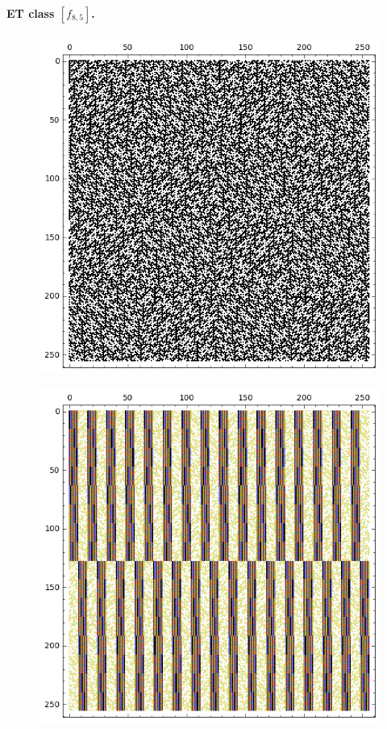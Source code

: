 \documentclass[12pt,a4paper]{article}
\begin{document}
\paragraph*{ET class $[f_{8,5}]$.}
\begin{figure}[!hb]
\centering
\begin{minipage}{.48\textwidth}
  \centering
  \includegraphics[width=.9\linewidth]{../matrix_plot/re8_5_weight_class_matrix.png}
  \label{fig:8_5_weight_class_matrix}
\end{minipage}%
\begin{minipage}{.48\textwidth}
  \centering
  \includegraphics[width=.9\linewidth]{../matrix_plot/re8_5_bent_cayley_graph_index_matrix.png}
  \label{fig:8_5_bent_cayley_graph_index_matrix}
\end{minipage}
\end{figure}
~
\end{document}
